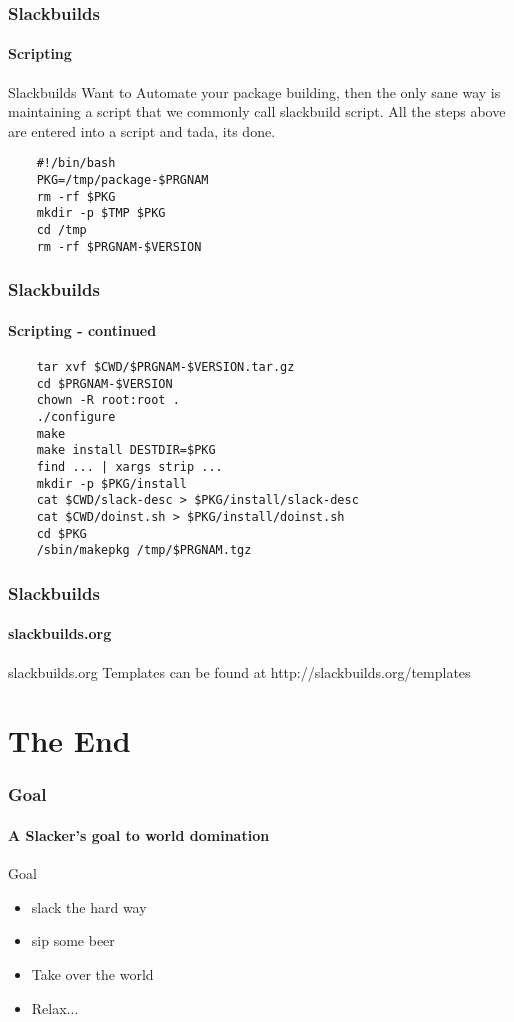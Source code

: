\documentclass[12pt,hyperref={pdfpagelabels=true}]{beamer}
\begin{document}
\begin{frame}[fragile]
  \frametitle{Slackbuilds}
  \framesubtitle{Scripting}
  \begin{block}{Slackbuilds}
    Want to Automate your package building, then the only sane way is
    maintaining a script that we commonly call slackbuild script.
    All the steps above are entered into a script and tada, its done.
  \end{block}

  \pause

  \begin{lstlisting}
    #!/bin/bash
    PKG=/tmp/package-$PRGNAM
    rm -rf $PKG
    mkdir -p $TMP $PKG
    cd /tmp
    rm -rf $PRGNAM-$VERSION
  \end{lstlisting}
\end{frame}

\begin{frame}[fragile]
  \frametitle{Slackbuilds}
  \framesubtitle{Scripting - continued}

  \begin{lstlisting}
    tar xvf $CWD/$PRGNAM-$VERSION.tar.gz
    cd $PRGNAM-$VERSION
    chown -R root:root .
    ./configure
    make
    make install DESTDIR=$PKG
    find ... | xargs strip ...
    mkdir -p $PKG/install
    cat $CWD/slack-desc > $PKG/install/slack-desc
    cat $CWD/doinst.sh > $PKG/install/doinst.sh
    cd $PKG
    /sbin/makepkg /tmp/$PRGNAM.tgz
  \end{lstlisting}
\end{frame}

\begin{frame}
  \frametitle{Slackbuilds}
  \framesubtitle{slackbuilds.org}
    \begin{block}{slackbuilds.org}
      Templates can be found at
      http://slackbuilds.org/templates
    \end{block}
\end{frame}

\section{The End}

\begin{frame}
  \frametitle{Goal}
  \framesubtitle{A Slacker's goal to world domination}
  \begin{block}{Goal}
    \begin{itemize}[<+-| alert@+>]
    \item slack the hard way
    \item sip some beer
    \item Take over the world
    \item Relax...
    \end{itemize}
  \end{block}
\end{frame}
\end{document}

